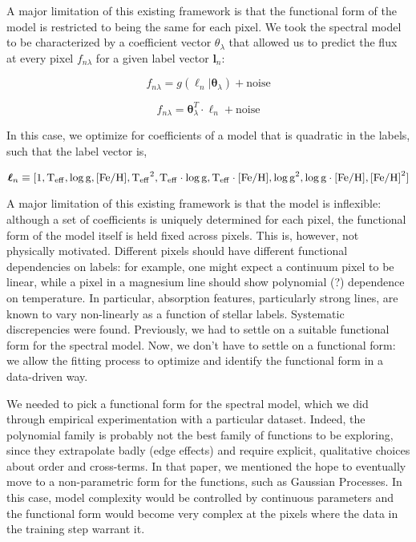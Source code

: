 \documentclass[12pt, preprint]{aastex}
\newcommand{\set}[1]{\bm{#1}}
\newcommand{\starlabel}{\ell}
\newcommand{\starlabelvec}{\set{\starlabel}}
\newcommand{\teff}{\mbox{$\rm T_{eff}$}}
\newcommand{\feh}{\mbox{$\rm [Fe/H]$}}
\newcommand{\logg}{\mbox{$\rm \log g$}}
\begin{document}
A major limitation of this existing framework is that the functional form of 
the model is restricted to being the same for each pixel. We took the 
spectral model to be characterized by a coefficient vector $\theta_\lambda$ 
that allowed us to predict the flux at every pixel $f_{n \lambda}$ for a 
given label vector $\textbf{l}_n$:

\begin{equation}
  f_{n\lambda} = g(\starlabelvec_n | \set{\theta}_\lambda) + \mbox{noise} 
\end{equation}

\begin{equation}
  f_{n\lambda} = \set{\theta}_\lambda^T \cdot \starlabelvec_n + \mbox{noise}  
\end{equation}

In this case, we optimize for coefficients of a model that is quadratic in the
labels, such that the label vector is,

\begin{equation}
  \starlabelvec_n \equiv 
  [1, \teff, \logg, \feh, \teff^2, \teff\cdot\logg, \teff\cdot\feh, \logg^2, \logg\cdot\feh, \feh^2]
\end{equation}

A major limitation of this existing framework is that the model is inflexible:
although a set of coefficients is uniquely determined for each pixel, 
the functional form of the model itself is held fixed across pixels. 
This is, however, not physically motivated.  Different pixels should have 
different functional dependencies on labels: for example, one might expect a 
continuum pixel to be linear, while a pixel in a magnesium line should show 
polynomial (?) dependence on temperature. In particular, absorption features,
particularly strong lines, are known to vary non-linearly as a function of 
stellar labels. Systematic discrepencies were found. Previously, we had to 
settle on a suitable functional form for the spectral model. Now, we don't have
to settle on a functional form: we allow the fitting process to optimize and
identify the functional form in a data-driven way.

We needed to pick a functional form for the spectral model, which we did
through empirical experimentation with a particular dataset. Indeed, the
polynomial family is probably not the best family of functions to be 
exploring, since they extrapolate badly (edge effects) and require explicit, 
qualitative choices about order and cross-terms. In that paper, we mentioned 
the hope to eventually move to a non-parametric form for the functions, such 
as Gaussian Processes. In this case, model complexity would be controlled by 
continuous parameters and the functional form would become very complex at 
the pixels where the data in the training step warrant it.
\end{document}

